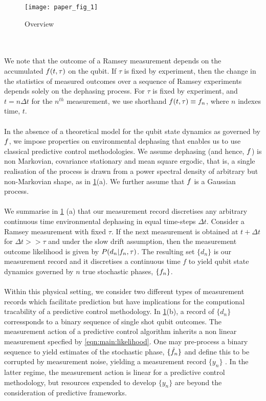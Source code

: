 \begin{figure}
\caption{Overview}
\texttt{[image: paper\_fig\_1]}
\label{fig:main:paper_fig_1}
\end{figure} 
\\
\\
We note that the outcome of a Ramsey measurement depends on the accumulated $f(t,\tau)$ on the qubit. If $\tau$ is fixed by experiment, then the change in the statistics of measured outcomes over a sequence of Ramsey experiments depends solely on the dephasing process.   For $\tau$ is fixed by experiment, and $t = n \Delta t$ for the $n^{th}$ measurement, we use shorthand $f(t,\tau) \equiv f_n$, where $n$ indexes time, $t$. 
\\
\\
In the absence of a theoretical model for the qubit state dynamics as governed by $f$, we impose properties on environmental dephasing that enables us to use classical predictive control methodologies. We assume dephasing (and hence, $f$) is non Markovian, covariance stationary and mean square ergodic, that is, a single realisation of the process is drawn from a power spectral density of arbitrary but non-Markovian shape, as in \cref{fig:main:paper_fig_1}(a). We further assume that $f$  is a Gaussian process. 
\\
\\
We summarise in \cref{fig:main:paper_fig_1} (a) that our measurement record discretises any arbitrary continuous time environmental dephasing in equal time-steps $\Delta t$. Consider a Ramsey measurement with fixed $\tau$. If the next measurement is obtained at $t + \Delta t$ for $\Delta t >> \tau$ and under the slow drift assumption, then the measurement outcome likelihood is given by $P(d_n | f_n, \tau)$. The resulting set $\{d_n\}$ is our measurement record and it  discretises a continuous time $f$ to yield qubit state dynamics governed by $n$ true stochastic phases, $\{f_n\}$.
\\
\\
Within this physical setting, we consider two different types of measurement records which facilitate prediction but have implications for the computional tracability of a predictive control methodology. In \cref{fig:main:paper_fig_1}(b), a record of $\{ d_n\}$  corressponds to a binary sequence of single shot qubit outcomes. The measurement action of a predictive control algorithm inherits a non linear measurement specfied by \cref{eqn:main:likelihood}. One may pre-process a binary sequence to yield estimates of the stochastic phase, $\{ \hat{f}_n\}$ and define this to be corrupted by measurement noise, yielding a measurement record $\{ y_n\}$ . In the latter regime, the measurement action is linear for a predictive control methodology, but resources expended to develop $\{ y_n\}$ are beyond the consideration of predictive frameworks.

